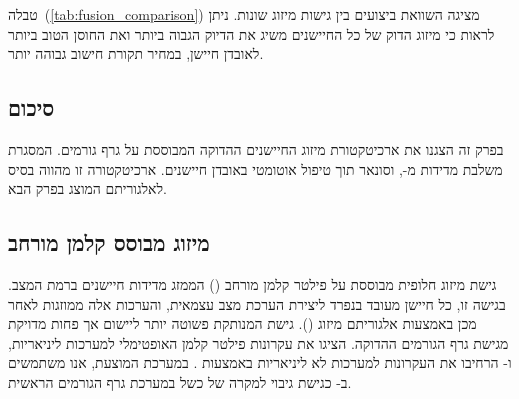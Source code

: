 \begin{table}[htbp]
    \centering
    \caption{השוואת ביצועים בין גישות מיזוג שונות. (Performance comparison of different fusion approaches.)}
    \label{tab:fusion_comparison}
\end{table}

טבלה~(\ref{tab:fusion_comparison}) מציגה השוואת ביצועים בין גישות מיזוג שונות. ניתן לראות כי מיזוג הדוק של כל החיישנים משיג את הדיוק הגבוה ביותר ואת החוסן הטוב ביותר לאובדן חיישן, במחיר תקורת חישוב גבוהה יותר.

\subsection{סיכום}
\label{sec:fusion_summary}

בפרק זה הצגנו את ארכיטקטורת מיזוג החיישנים ההדוקה המבוססת על גרף גורמים. המסגרת משלבת מדידות מ-,  וסונאר תוך טיפול אוטומטי באובדן חיישנים. ארכיטקטורה זו מהווה בסיס לאלגוריתם  המוצג בפרק הבא.

\subsection{מיזוג מבוסס קלמן מורחב}
\label{sec:ekf_fusion}

גישת מיזוג חלופית מבוססת על פילטר קלמן מורחב () הממזג מדידות חיישנים ברמת המצב. בגישה זו, כל חיישן מעובד בנפרד ליצירת הערכת מצב עצמאית, והערכות אלה ממוזגות לאחר מכן באמצעות אלגוריתם מיזוג (). גישת  המנותקת פשוטה יותר ליישום אך פחות מדויקת מגישת גרף הגורמים ההדוקה. \citet{Kalman1960} הציגו את עקרונות פילטר קלמן האופטימלי למערכות ליניאריות, ו-\citet{Thrun2005ProbRobotics} הרחיבו את העקרונות למערכות לא ליניאריות באמצעות . במערכת המוצעת, אנו משתמשים ב- כגישת גיבוי למקרה של כשל במערכת גרף הגורמים הראשית.


